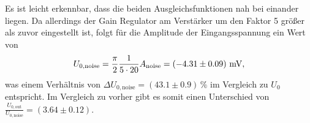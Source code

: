 \noindent
Es ist leicht erkennbar, dass die beiden Ausgleichsfunktionen nah bei einander liegen. 
Da allerdings der Gain Regulator am Verstärker um den Faktor 5 größer als zuvor eingestellt ist,
folgt für die Amplitude der Eingangsspannung ein Wert von 
\begin{align*}
    U_{0,\text{noise}} = \frac{\pi}{2} \frac{1}{5 \cdot 20} A_\text{noise} = \left(-4.31 \pm 0.09\right) \, \unit[]{\milli\volt},
\end{align*}
was einem Verhältnis von $\Delta U_{0,\text{noise}} = \left(43.1 \pm 0.9\right) \, \%$ im Vergleich zu $U_0$ entspricht.
Im Vergleich zu vorher gibt es somit einen Unterschied von $\frac{U_{0,\text{out}}}{U_{0,\text{noise}}} = \left(3.64 \pm 0.12\right)$.


